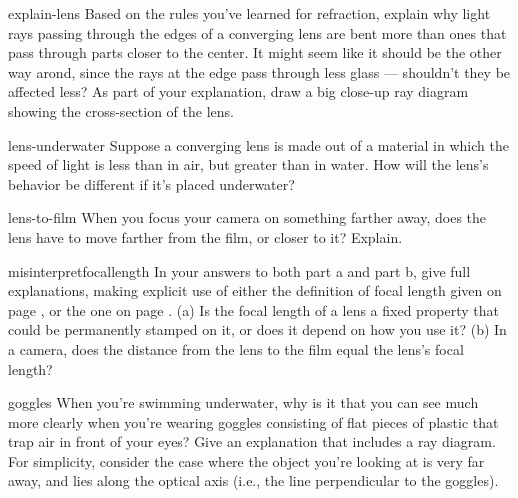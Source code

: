 \begin{hwsection}

\begin{hw}{explain-lens}
Based on the rules you've learned for refraction, explain why light rays passing
through the edges of a converging lens are bent more than ones that pass through parts
closer to the center. It might seem like it should be the other way arond, since the rays
at the edge pass through less glass --- shouldn't they be affected less? As part of
your explanation, draw a big close-up ray diagram showing the cross-section of the lens.
\end{hw}

\begin{hw}{lens-underwater}
Suppose a converging lens is made out of a material
in which the speed of light is less than in air, but greater than in water. How will the
lens's behavior be different if it's placed underwater?
\end{hw}

\begin{hw}{lens-to-film}
When you focus your camera on something farther away, does the lens have to move farther from
the film, or closer to it? Explain.
\end{hw}

\begin{hw}{misinterpretfocallength}
In your answers to both part a and part b, give full explanations,
making explicit use of either the definition of focal length given on page
\pageref{focal-length-definition}, or the
one on page \pageref{alt-focal-length-definition}.\hwendpart
(a) Is the focal length of a lens a fixed property that could be permanently stamped on it,
or does it depend on how you use it?\hwendpart
(b) In a camera, does the distance from the lens to the film equal the lens's focal
length?
\end{hw}

\begin{hw}{goggles}
When you're swimming underwater, why is it that you can see much more clearly when you're
wearing goggles consisting of flat pieces of plastic
that trap air in front of your eyes? Give an explanation that includes a ray
diagram. For simplicity, consider the case where the object you're looking at is very far away,
and lies along the optical axis (i.e., the line perpendicular to the goggles).


\end{hw}
\end{hwsection}
